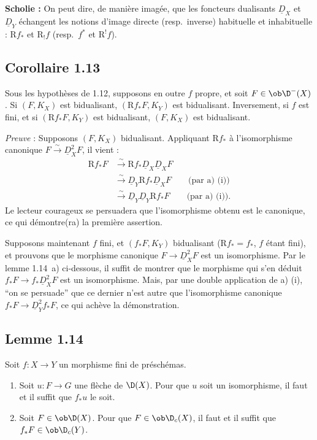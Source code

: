 \textbf{Scholie :} On peut dire, de manière imagée, que les foncteurs dualisants 
$\underline{D}_X$ et $\underline{D}_Y$
échangent les notions d'image directe (resp.~inverse) habituelle et inhabituelle : $\mathrm{R} f_{*}$ et $\mathrm{R}_{!}f$ (resp.~$f^{*}$ et $\mathrm{R}^{!}f$).

\subsection*{Corollaire 1.13}
Sous les hypothèses de 1.12, supposons en outre $f$ propre, et soit $F \in \ob \D^{-}(X)$. Si $(F, K_X)$ est bidualisant, $(\mathrm{R} f_{*}F, K_Y)$ est bidualisant. Inversement, si $f$ est fini, et si $(\mathrm{R} f_{*}F, K_Y)$ est bidualisant, $(F, K_X)$ est bidualisant.

\emph{Preuve} : Supposons $(F, K_X)$ bidualisant. Appliquant $\mathrm{R} f_{*}$ à l'isomorphisme canonique $F \xrightarrow{\sim} \underline{D}_X^{2} F$, il vient :
\begin{align*}
\mathrm{R} f_{*} F &\xrightarrow{\sim} \mathrm{R} f_{*} \underline{D}_X \underline{D}_X F \\
&\xrightarrow{\sim} \underline{D}_Y \mathrm{R} f_{*} \underline{D}_X F \qquad \text{(par a) (i))} \\
&\xrightarrow{\sim} \underline{D}_Y \underline{D}_Y \mathrm{R} f_{*} F \qquad \text{(par a) (i)).}
\end{align*}
Le lecteur courageux se persuadera que l'isomorphisme obtenu est le canonique, ce qui démontre(ra) la première assertion.

Supposons maintenant $f$ fini, et $(f_{*}F, K_Y)$ bidualisant ($\mathrm{R} f_{*} = f_{*}$, $f$ étant fini), et prouvons que le morphisme canonique $F \to \underline{D}_X^{2} F$ est un isomorphisme. Par le lemme 1.14~a) ci-dessous, il suffit de montrer que le morphisme qui s'en déduit $f_{*}F \to f_{*}\underline{D}_X^{2} F$ est un isomorphisme. Mais, par une double application de a) (i), ``on se persuade'' que ce dernier n'est autre que l'isomorphisme canonique $f_{*}F \to \underline{D}_Y^{2} f_{*}F$, ce qui achève la démonstration.

\subsection*{Lemme 1.14}
Soit $f : X \to Y$ un morphisme fini de préschémas.
\begin{enumerate}
\item[a)] Soit $u : F \to G$ une flèche de $\D(X)$. Pour que $u$ soit un isomorphisme, il faut et il suffit que $f_{*}u$ le soit.
\item[b)]
Soit $F \in \ob \D(X)$. Pour que $F \in \ob \D_c(X)$, il faut et il suffit que $f_{*}F \in \ob \D_c(Y)$.
\end{enumerate}

